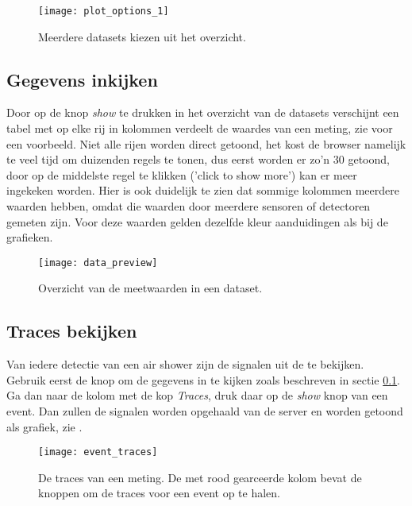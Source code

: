\begin{figure}
    \centering
    \texttt{[image: plot\_options\_1]}
    \caption{Meerdere datasets kiezen uit het overzicht.}
    \label{fig:plot_options_1}
\end{figure}


\subsection{Gegevens inkijken}\label{subsec:gegevens}

Door op de knop \emph{show} te drukken in het overzicht van de datasets
verschijnt een tabel met op elke rij in kolommen verdeelt de waardes van
een meting, zie  voor een voorbeeld. Niet alle
rijen worden direct getoond, het kost de browser namelijk te veel tijd
om duizenden regels te tonen, dus eerst worden er zo'n 30 getoond, door
op de middelste regel te klikken ('click to show more') kan er meer
ingekeken worden. Hier is ook duidelijk te zien dat sommige kolommen
meerdere waarden hebben, omdat die waarden door meerdere sensoren of detectoren
gemeten zijn. Voor deze waarden gelden dezelfde kleur aanduidingen als bij
de grafieken.

\begin{figure}
    \centering
    \texttt{[image: data\_preview]}
    \caption{Overzicht van de meetwaarden in een dataset.}
    \label{fig:data_preview}
\end{figure}


\subsection{Traces bekijken}

Van iedere detectie van een air shower zijn de signalen uit de \pmts te
bekijken. Gebruik eerst de knop om de gegevens in te kijken zoals
beschreven in sectie \ref{subsec:gegevens}. Ga dan naar de kolom met de
kop \emph{Traces}, druk daar op de \emph{show} knop van een event. Dan
zullen de \pmt signalen worden opgehaald van de server en worden getoond
als grafiek, zie .

\begin{figure}
    \centering
    \texttt{[image: event\_traces]}
    \caption{De traces van een meting. De met rood gearceerde kolom
             bevat de knoppen om de traces voor een event op te halen.}
    \label{fig:event_traces}
\end{figure}


